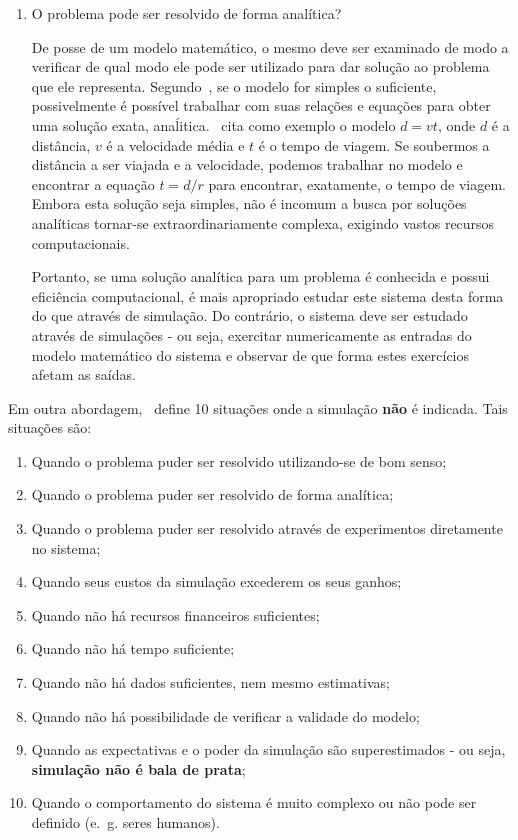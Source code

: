 \begin{enumerate}
\item O problema pode ser resolvido de forma analítica?

De posse de um modelo matemático, o mesmo deve ser examinado de modo a verificar
de qual modo ele pode ser utilizado para dar solução ao problema que ele
representa. Segundo~\cite{Law}, se o modelo for simples o suficiente,
possivelmente é possível trabalhar com suas relações e equações para obter uma
solução exata, anaĺitica.~\cite{Law} cita como exemplo o modelo $d = vt$, onde
$d$ é a distância, $v$ é a velocidade média e $t$ é o tempo de viagem. Se
soubermos a distância a ser viajada e a velocidade, podemos trabalhar no modelo
e encontrar a equação $t = d/r$ para encontrar, exatamente, o tempo de viagem.
Embora esta solução seja simples, não é incomum a busca por soluções analíticas
tornar-se extraordinariamente complexa, exigindo vastos recursos computacionais.

Portanto, se uma solução analítica para um problema é conhecida e possui
eficiência computacional, é mais apropriado estudar este sistema desta forma do
que através de simulação. Do contrário, o sistema deve ser estudado através de
simulações - ou seja, exercitar numericamente as entradas do modelo matemático
do sistema e observar de que forma estes exercícios afetam as saídas.
\end{enumerate}

Em outra abordagem,~\cite{BanksGibson} define 10 situações onde a simulação
\textbf{não} é indicada. Tais situações são:

\begin{enumerate}
\item Quando o problema puder ser resolvido utilizando-se de bom senso;
\item Quando o problema puder ser resolvido de forma analítica;
\item Quando o problema puder ser resolvido através de experimentos diretamente
      no sistema;
\item Quando seus custos da simulação excederem os seus ganhos;
\item Quando não há recursos financeiros suficientes;
\item Quando não há tempo suficiente;
\item Quando não há dados suficientes, nem mesmo estimativas;
\item Quando não há possibilidade de verificar a validade do modelo;
\item Quando as expectativas e o poder da simulação são superestimados - ou
      seja, \textbf{simulação não é bala de prata};
\item Quando o comportamento do sistema é muito complexo ou não pode ser
      definido (e.~g. seres humanos).
\end{enumerate}

